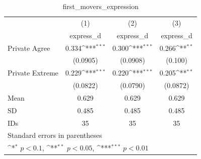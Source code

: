 \begin{table}[htbp]\centering
\def\sym#1{\ifmmode^{#1}\else\(^{#1}\)\fi}
\caption{first\_movers\_expression}
\begin{tabular}{l*{3}{c}}
\hline\hline
                                &\multicolumn{1}{c}{(1)}&\multicolumn{1}{c}{(2)}&\multicolumn{1}{c}{(3)}\\
                                &\multicolumn{1}{c}{express\_d}&\multicolumn{1}{c}{express\_d}&\multicolumn{1}{c}{express\_d}\\
\hline
Private Agree                   &    0.334\sym{***}&    0.300\sym{***}&    0.266\sym{**} \\
                                & (0.0905)         & (0.0908)         &  (0.100)         \\
Private Extreme                 &    0.229\sym{***}&    0.220\sym{***}&    0.205\sym{**} \\
                                & (0.0822)         & (0.0790)         & (0.0872)         \\
\hline
Mean                            &    0.629         &    0.629         &    0.629         \\
SD                              &    0.485         &    0.485         &    0.485         \\
IDs                             &       35         &       35         &       35         \\
\hline\hline
\multicolumn{4}{l}{\footnotesize Standard errors in parentheses}\\
\multicolumn{4}{l}{\footnotesize \sym{*} \(p<0.1\), \sym{**} \(p<0.05\), \sym{***} \(p<0.01\)}\\
\end{tabular}
\end{table}
